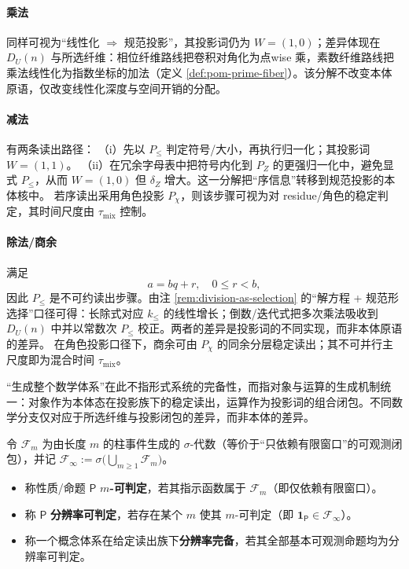 \paragraph{乘法}同样可视为“线性化 $\Rightarrow$ 规范投影”，其投影词仍为 $W=(1,0)$；差异体现在 $D_U(n)$ 与所选纤维：相位纤维路线把卷积对角化为点wise 乘，素数纤维路线把乘法线性化为指数坐标的加法（定义 \ref{def:pom-prime-fiber}）。该分解不改变本体原语，仅改变线性化深度与空间开销的分配。

\paragraph{减法}有两条读出路径：
（i）先以 $P_{\le}$ 判定符号/大小，再执行归一化；其投影词 $W=(1,1)$。
（ii）在冗余字母表中把符号内化到 $P_Z$ 的更强归一化中，避免显式 $P_{\le}$，从而 $W=(1,0)$ 但 $\delta_Z$ 增大。这一分解把“序信息”转移到规范投影的本体核中。
若序读出采用角色投影 $P_\chi$，则该步骤可视为对 residue/角色的稳定判定，其时间尺度由 $\tau_{\mathrm{mix}}$ 控制。

\paragraph{除法/商余}满足
\[
a=bq+r,\quad 0\le r<b,
\]
因此 $P_{\le}$ 是不可约读出步骤。由注 \ref{rem:division-as-selection} 的“解方程 + 规范形选择”口径可得：长除式对应 $k_{\le}$ 的线性增长；倒数/迭代式把多次乘法吸收到 $D_U(n)$ 中并以常数次 $P_{\le}$ 校正。两者的差异是投影词的不同实现，而非本体原语的差异。
在角色投影口径下，商余可由 $P_\chi$ 的同余分层稳定读出；其不可并行主尺度即为混合时间 $\tau_{\mathrm{mix}}$。

\begin{remark}\label{rem:pom-math-world}
“生成整个数学体系”在此不指形式系统的完备性，而指对象与运算的生成机制统一：对象作为本体态在投影族下的稳定读出，运算作为投影词的组合闭包。不同数学分支仅对应于所选纤维与投影闭包的差异，而非本体的差异。
\end{remark}

\begin{definition}[分辨率可判定与分辨率完备性]\label{def:pom-resolution-completeness}
令 $\mathcal{F}_m$ 为由长度 $m$ 的柱事件生成的 $\sigma$-代数（等价于“只依赖有限窗口”的可观测闭包），并记 $\mathcal{F}_\infty:=\sigma\!\bigl(\bigcup_{m\ge 1}\mathcal{F}_m\bigr)$。
\begin{itemize}
  \item 称性质/命题 $\mathsf{P}$ \textbf{$m$-可判定}，若其指示函数属于 $\mathcal{F}_m$（即仅依赖有限窗口）。
  \item 称 $\mathsf{P}$ \textbf{分辨率可判定}，若存在某个 $m$ 使其 $m$-可判定（即 $\mathbf{1}_{\mathsf P}\in\mathcal{F}_\infty$）。
  \item 称一个概念体系在给定读出族下\textbf{分辨率完备}，若其全部基本可观测命题均为分辨率可判定。
\end{itemize}
\end{definition}

